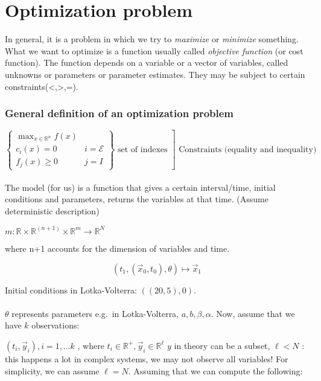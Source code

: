 \chapter{Optimization problem}


In general, it is a problem in which we try to \emph{maximize} or \emph{minimize}
something. What we want to optimize is a function usually called
\emph{objective function} (or cost function). The function depends on a
variable or a vector of variables, called unknowns or parameters or
parameter estimates. They may be subject to certain
constraints(\textless,\textgreater,=).

\subsection{General definition of an optimization problem}

$\left.\left\{\begin{array}{ll} \max _{x \in \mathbb{R}^n} f(x) & \\ c_i(x)=0 & i=\mathcal{E}\\ f_j(x) \geq 0 & j = I \end{array}\right\} \text { set of indexes }\right] \text { Constraints (equality and inequality) }$
\\
\\
\noindent
The model (for us) is a function that gives a certain interval/time,
initial conditions and parameters, returns the variables at that time.
(Assume deterministic description)

$m: \mathbb{R} \times \mathbb{R}^{(n+1)} \times \mathbb{R}^m \rightarrow \mathbb{R}^N$

where n+1 accounts for the dimension of variables and time.

$$
\left(t_1,\left(\vec{x}_0, t_0\right), \theta\right)
\longmapsto \vec{x}_1 $$

Initial conditions in Lotka-Volterra: $((20,5), 0)$.
\\
\\
\noindent
$\theta$ represents parameters e.g.~in Lotka-Volterra, $a,b,\beta,\alpha$. Now, assume that we have $k$ observations:

$(t_i ,\vec{y}_i), i=1, \ldots k$ , where
$t_i \in \mathbb{R}^+, \vec{y}_i \in \mathbb{R}^\ell$
\noindent
$y$ in theory can be a subset, $\ell<N$ : this happens a lot in complex
systems, we may not observe all variables! For simplicity, we can assume
$\ell=N$. Assuming that we can compute the following:

